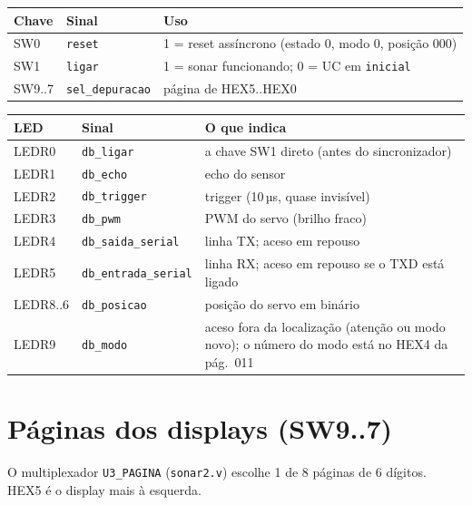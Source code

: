 \documentclass[9pt,a4paper]{extarticle}
\newcommand{\s}[1]{\texttt{#1}}          %
\begin{document}
\begin{minipage}[t]{0.40\linewidth}
\vspace{0pt}
\begin{tabularx}{\linewidth}{@{}l l Y@{}}
\toprule
Chave & Sinal & Uso \\
\midrule
SW0 & \s{reset} & 1 = reset assíncrono (estado 0, modo 0, posição 000) \\
SW1 & \s{ligar} & 1 = sonar funcionando; 0 = UC em \s{inicial} \\
SW9..7 & \s{sel\_depuracao} & página de HEX5..HEX0 \\
\bottomrule
\end{tabularx}
\end{minipage}\hfill
\begin{minipage}[t]{0.57\linewidth}
\vspace{0pt}
\begin{tabularx}{\linewidth}{@{}l l Y@{}}
\toprule
LED & Sinal & O que indica \\
\midrule
LEDR0 & \s{db\_ligar} & a chave SW1 direto (antes do sincronizador) \\
LEDR1 & \s{db\_echo} & echo do sensor \\
LEDR2 & \s{db\_trigger} & trigger (10\,µs, quase invisível) \\
LEDR3 & \s{db\_pwm} & PWM do servo (brilho fraco) \\
LEDR4 & \s{db\_saida\_serial} & linha TX; aceso em repouso \\
LEDR5 & \s{db\_entrada\_serial} & linha RX; aceso em repouso se o TXD está ligado \\
LEDR8..6 & \s{db\_posicao} & posição do servo em binário \\
LEDR9 & \s{db\_modo} & aceso fora da localização (atenção ou modo novo); o número do modo está no HEX4 da pág.\ 011 \\
\bottomrule
\end{tabularx}
\end{minipage}

\section{Páginas dos displays (SW9..7)}

O multiplexador \s{U3\_PAGINA} (\s{sonar2.v}) escolhe 1 de 8 páginas de 6
dígitos. HEX5 é o display mais à esquerda.
\end{document}
